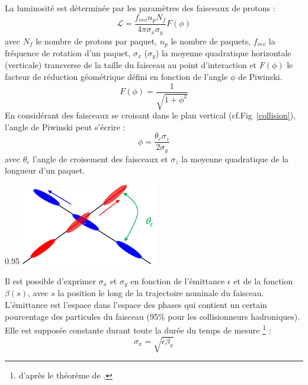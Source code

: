 La luminosité est déterminée par les paramètres des faisceaux de protons :
\begin{equation}
\mathcal{L}=\frac{f_{rev}n_{p}N_{f}}{4\pi \sigma_{x} \sigma_{y}} F(\phi)
\end{equation}
avec $N_{f}$ le nombre de protons par paquet, $n_{p}$ le nombre de paquets, $f_{rev}$ la fréquence de rotation d'un paquet, $\sigma_{x}$ ($\sigma_{y}$) la moyenne quadratique horizontale (verticale) transverse de la taille du faisceau au point d'interaction et $F(\phi)$ le facteur de réduction géométrique défini en fonction de l'angle $\phi$ de Piwinski.
\begin{equation}
F(\phi)=\frac{1}{\sqrt{1+\phi^{2}}}
\end{equation}
En considérant des faisceaux se croisant dans le plan vertical (cf.Fig~\ref{collision}), l'angle de Piwinski peut s'écrire :
\begin{equation}
\phi=\frac{\theta_{c}\sigma_{z}}{2\sigma_{y}}
\end{equation}
avec $\theta_{c}$ l'angle de croisement des faisceaux et $\sigma_{z}$ la moyenne quadratique de la longueur d'un paquet.


\begin{minipagewithmarginpars}[ht!]{0.95\textwidth}
\centering
\includegraphics[width=0.45\textwidth]{LHC/collision.png}
\label{collision}	
\end{minipagewithmarginpars}

Il est possible d'exprimer $\sigma_{x}$ et $\sigma_{y}$ en fonction de l'émittance $\epsilon$ et de la fonction $\beta(s)$, avec $s$ la position le long de la trajectoire nominale du faisceau. L'émittance est l'espace dans l'espace des phases qui contient un certain pourcentage des particules du faisceau (\num{95}\% pour les collisionneurs hadroniques). Elle est supposée constante durant toute la durée du temps de mesure \footnote{d'après le théorème de .} :
\begin{equation}
\sigma_{x}=\sqrt{\epsilon\beta_{x}}
\end{equation}

